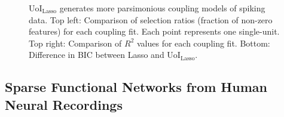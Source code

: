 \documentclass[letterpaper, 10 pt, conference]{ieeeconf}  %
\begin{document}
\begin{figure}[t]
    \centering
    \caption{UoI$_{\text{Lasso}}$ generates more parsimonious coupling models of spiking data. Top left: Comparison of selection ratios (fraction of non-zero features) for each coupling fit. Each point represents one single-unit. Top right: Comparison of $R^2$ values for each coupling fit. Bottom: Difference in BIC between Lasso and UoI$_{\text{Lasso}}$.}
    \label{fig:nhp}
\end{figure}
\subsection{Sparse Functional Networks from Human Neural Recordings}
\end{document}
